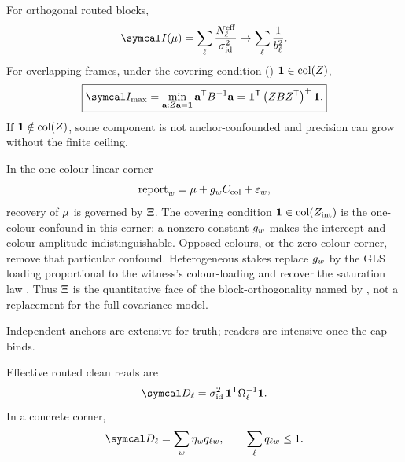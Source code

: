 \documentclass[../main]{subfiles}
\begin{document}
\begin{proposition}
  For orthogonal routed blocks,
  \begin{equation}
    \precisionof{\recoveryfact}
    =\sum_\ell\frac{\effectivereads[\ell]}{\idvariance}
    \to
    \sum_\ell\frac{1}{\anchorvariance}.
    \label{eq:recov:blocksum}
  \end{equation}
  For overlapping frames, under the covering condition
  () $\mathbf 1\in\operatorname{col}(Z)$,
  \begin{equation}
    \boxed{
      \precision\sb{\max}
      =\min_{\coeffvec:\frameloading\coeffvec=\mathbf 1}
        \coeffvec\transpose\anchorprior\sp{-1}\coeffvec
      =\mathbf 1\transpose
        \pinv{\frameloading\anchorprior\frameloading\transpose}\mathbf 1.
    }
    \label{eq:recov:ceiling}
  \end{equation}
  If $\mathbf 1\notin\operatorname{col}(Z)$, some component is not
  anchor-confounded and precision can grow without the finite ceiling.
\end{proposition}

\begin{remark}
  In the one-colour linear corner
  \begin{equation}
    \operatorname{report}\sb{w}
      =
      \mu+g\sb{w}C\sb{\mathrm{col}}+\varepsilon\sb{w},
    \label{eq:recov:spanmodel}
  \end{equation}
  recovery of $\mu$ is governed by $\Xi$. The covering condition
  $\mathbf{1}\in\operatorname{col}(Z\sb{\mathrm{int}})$ is the one-colour confound in this
  corner: a nonzero constant $g\sb{w}$ makes the intercept and colour-amplitude
  indistinguishable. Opposed colours, or the zero-colour corner, remove that particular
  confound. Heterogeneous stakes replace $g\sb{w}$ by the GLS loading proportional to
  the witness's colour-loading and recover the saturation law . Thus
  $\Xi$ is the quantitative face of the block-orthogonality named by ,
  not a replacement for the full covariance model.
\end{remark}

\begin{insight}
  Independent anchors are extensive for truth; readers are intensive once the cap binds.
\end{insight}

\begin{proposition}
  Effective routed clean reads are
  \begin{equation}
    \cleanreads[\ell]
    =\idvariance\,\mathbf 1\transpose\idcov\sb{\ell}\sp{-1}\mathbf 1.
    \label{eq:recov:route}
  \end{equation}
  In a concrete corner,
  \begin{equation}
    \cleanreads[\ell]=\sum_w\eta_w q_{\ell w},
    \qquad
    \sum_\ell q_{\ell w}\le1.
    \label{eq:recov:routecorner}
  \end{equation}
\end{proposition}
\end{document}

